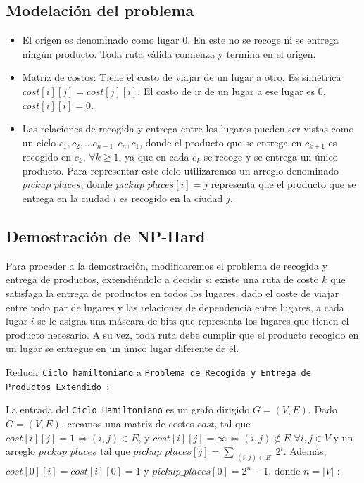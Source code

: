 \documentclass[twocolumn, fontsize=10pt]{article}
\begin{document}
\subsection{Modelación del problema}
\begin{itemize}
    \item El origen es denominado como lugar \(0\). En este no se recoge ni se entrega ningún producto. Toda ruta válida comienza y termina en el origen.
    \item Matriz de costos: Tiene el costo de viajar de un lugar a otro. Es simétrica \(cost[i][j] = cost[j][i]\). El costo de ir de un lugar a ese lugar es \(0\), \(cost[i][i]=0\).
    \item Las relaciones de recogida y entrega entre los lugares pueden ser vistas como un ciclo \(c_1,c_2,...c_{n-1},c_n,c_1\), donde el producto que se entrega en \(c_{k+1}\) es recogido en \(c_k\), \(\forall k \geq 1\), ya que en cada \(c_k\) se recoge y se entrega un único producto. Para representar este ciclo utilizaremos un arreglo denominado \(pickup\_places\), donde \(pickup\_places[i]=j\) representa que el producto que se entrega en la ciudad \(i\) es recogido en la ciudad \(j\).
 
\end{itemize}

\subsection{Demostración de NP-Hard}
Para proceder a la demostración, modificaremos el problema de recogida y entrega de productos, extendiéndolo a decidir si existe una ruta de costo \(k\) que satisfaga la entrega de productos en todos los lugares, dado el coste de viajar entre todo par de lugares y las relaciones de dependencia entre lugares, a cada lugar \(i\) se le asigna una máscara de bits que representa los lugares que tienen el producto necesario. A su vez, toda ruta debe cumplir que el producto recogido en un lugar se entregue en un único lugar diferente de él.

Reducir \texttt{Ciclo hamiltoniano} a \texttt{Problema de Recogida y Entrega de Productos Extendido }:
 
La entrada del  \texttt{Ciclo Hamiltoniano} es un grafo dirigido $G=(V,E)$. Dado $G=(V,E)$, creamos una matriz de costes \(cost\), tal que \(cost[i][j]=1 \iff (i,j) \in E\), y \(cost[i][j]=\infty \iff (i,j) \notin E\) \(\forall i, j \in V\) y un arreglo \(pickup\_places\) tal que \(pickup\_places[j] = \sum_{\substack{(i,j) \in E}} 2^i\). Además, \(cost[0][i] =cost[i][0]=1 \text{ y } pickup\_places[0]=2^n-1 \text{, donde } n = |V| \) :
\end{document}
